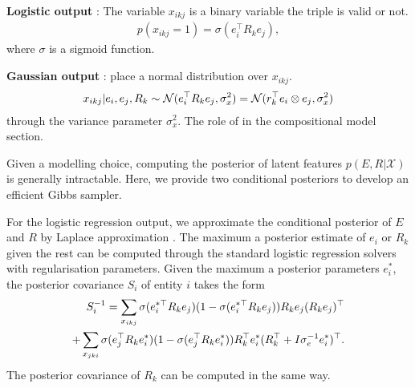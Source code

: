 \textbf{Logistic output }: The variable $x_{ikj}$ is a 
binary  variable  the triple is valid or not.
\begin{align}
p(x_{ikj}=1) = \sigma(e_i^{\top} R_k e_j),
\end{align}
where $\sigma$ is a sigmoid function.

\textbf{Gaussian output }:
 place a normal distribution over $x_{ikj}$.
\begin{align}
x_{ikj} |e_i, e_j, R_k \sim \mathcal{N}(e_i^{\top} R_k e_j, \sigma_x^2) = \mathcal{N}(r_k^{\top} e_i \otimes e_j, \sigma_x^2)  \notag %
\end{align} %
through the variance parameter $\sigma_x^2$. 
The role of  in the compositional model section.

Given a modelling choice, computing the posterior of latent features $p(E, R|
\mathcal{X})$ is generally intractable. Here, we provide two conditional 
posteriors to develop an efficient Gibbs sampler.

For the logistic regression output, we approximate the conditional posterior of 
$E$ and $R$ by Laplace approximation \cite{bishop2006pattern}. The maximum a 
posterior estimate of $e_i$ or $R_k$ given the rest can be computed through the 
standard logistic regression solvers with regularisation parameters. Given the 
maximum a posterior parameters $e_i^*$, the posterior covariance $S_i$ of entity 
$i$ takes the form
\begin{align}
S_i^{-1} = \sum_{x_{ikj}} \sigma(e_{i}^{*\top} R_k e_{j}) (1 - \sigma(e_{i}^{*\top} R_k e_{j})) R_k
e_{j}(R_k e_{j})^\top \notag \\
 + \sum_{x_{jki}} \sigma(e_{j}^{\top} R_k e_{i}^*) ( 1- \sigma(e_{j}^{\top} R_k e_{i}^*)) R_k^\top e^*_{i}(R_k^\top + I\sigma_e^{-1}
e^*_{i})^\top. \notag 
\end{align}
The posterior covariance of $R_k$ can be computed in the same way.

